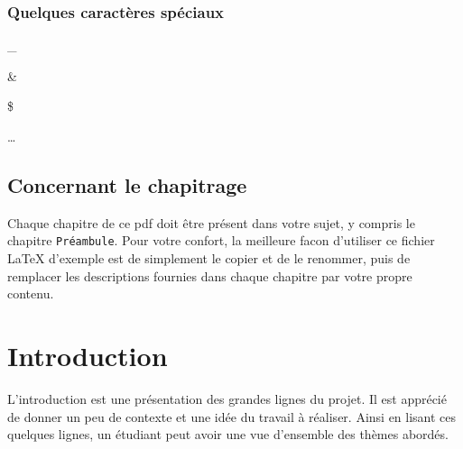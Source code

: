 \documentclass{42-fr}
\begin{document}
        \newpage


        \subsection{Quelques caract\`eres sp\'eciaux}

            \begin{description}\itemsep1pt
                \item [Underscore :] \_
                \item [Esperluette :] \&
                \item [Dollar :] \$
                \item [Points de suspension :] \dots
            \end{description}




     \section{Concernant le chapitrage}

     Chaque chapitre de ce pdf doit \^etre pr\'esent dans votre sujet,
     y compris le chapitre \texttt{Pr\'eambule}. Pour votre confort,
     la meilleure facon d'utiliser ce fichier LaTeX d'exemple est de
     simplement le copier et de le renommer, puis de remplacer les
     descriptions fournies dans chaque chapitre par votre propre
     contenu.\\



\chapter{Introduction}

    L'introduction est une pr\'esentation des grandes lignes du
    projet. Il est appr\'eci\'e de donner un peu de contexte et une
    id\'ee du travail \`a r\'ealiser. Ainsi en lisant ces quelques
    lignes, un \'etudiant peut avoir une vue d'ensemble des th\`emes
    abord\'es.
\end{document}
